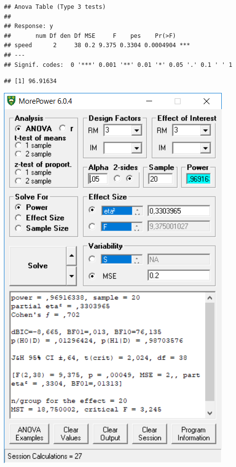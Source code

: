 \documentclass[]{book}
\newenvironment{Shaded}{\begin{snugshade}}{\end{snugshade}}
\newcommand{\CommentTok}[1]{\textcolor[rgb]{0.56,0.35,0.01}{\textit{#1}}}
\newcommand{\NormalTok}[1]{#1}
\newcommand{\OperatorTok}[1]{\textcolor[rgb]{0.81,0.36,0.00}{\textbf{#1}}}
\begin{document}
\begin{verbatim}
## Anova Table (Type 3 tests)
## 
## Response: y
##       num Df den Df MSE     F    pes    Pr(>F)    
## speed      2     38 0.2 9.375 0.3304 0.0004904 ***
## ---
## Signif. codes:  0 '***' 0.001 '**' 0.01 '*' 0.05 '.' 0.1 ' ' 1
\end{verbatim}

\begin{Shaded}
\end{Shaded}

\begin{verbatim}
## [1] 96.91634
\end{verbatim}

\includegraphics{screenshots/morepower_3.png}
\end{document}
